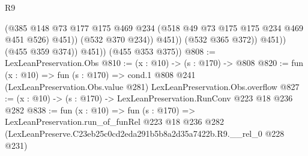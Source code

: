 \begin{lexlean}{R9}
\begin{coremodule}
                          (@385
                            @148
                            @73
                            @177
                            @175
                            @469
                            @234
                            (@518 @49 @73 @175 @175 @234 @469 @451 @526)
                            @451))
                        (@532 @370 @234))
                      @451))
                  (@532 @365 @372))
                @451))
            (@455 @359 @374))
          @451))
      (@455 @353 @375))
@808 := LexLeanPreservation.Obs
@810 := (x : @10) -> (s : @170) -> @808
@820 := fun (x : @10) =>
  fun (s : @170) =>
  cond.{1} @808 @241 (LexLeanPreservation.Obs.value @281) LexLeanPreservation.Obs.overflow
@827 := (x : @10) -> (s : @170) -> LexLeanPreservation.RunConv @223 @18 @236 @282
@838 := fun (x : @10) =>
  fun (s : @170) =>
  LexLeanPreservation.run_of_funRel
    @223
    @18
    @236
    @282
    (LexLeanPreserve.C23eb25c0cd2eda291b5b8a2d35a7422b.R9.__rel_0 @228 @231)
\end{coremodule}
\end{lexlean}
